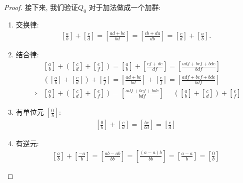 \documentclass[utf8]{ctexbook}
\begin{document}
\begin{proof}
接下来, 我们验证$Q_0$ 对于加法做成一个加群:
\begin{enumerate}
\item{交换律:
\begin{align*}
\left[ \frac{a}{b} \right]  + \left[ \frac{c}{d} \right] = \left[ \frac{a d  + b c }{b d} \right] = \left[ \frac{c b  + d a }{d b} \right] = \left[ \frac{c}{d} \right] + \left[ \frac{a}{b} \right]   .
\end{align*}
}
\item{结合律:
\begin{align*}
& \left[ \frac{a}{b} \right] + \left(\left[ \frac{c}{d} \right] + \left[ \frac{e}{f} \right]  \right) = \left[ \frac{a}{b} \right] + \left[ \frac{cf + de  }{df} \right]  =  \left[ \frac{adf + bcf + bde  }{bdf} \right] \\
& \left( \left[ \frac{a}{b} \right] + \left[ \frac{c}{d} \right] \right) + \left[ \frac{e}{f} \right] =  \left[ \frac{a d  + b c }{b d} \right] + \left[ \frac{e}{f} \right] = \left[ \frac{a d f + b c f+ bde}{b d f} \right] \\
\Longrightarrow & \left[ \frac{a}{b} \right] + \left(\left[ \frac{c}{d} \right] + \left[ \frac{e}{f} \right]  \right) = \left[ \frac{adf + bcf + bde  }{bdf} \right] = \left( \left[ \frac{a}{b} \right] + \left[ \frac{c}{d} \right] \right) + \left[ \frac{e}{f} \right] 
\end{align*}
}
\item{有单位元 $ \left[ \frac{0}{b} \right] $:
\begin{align*}
\left[ \frac{0}{b} \right] + \left[ \frac{c}{d} \right] = \left[ \frac{b c}{b d} \right] = \left[ \frac{c}{d} \right] 
\end{align*}

}
\item{有逆元:
\begin{align*}
\left[ \frac{a}{b} \right] + \left[ \frac{-a}{b} \right] = \left[ \frac{a b - a b}{b b} \right] = \left[ \frac{(a  - a) b}{b b} \right] = \left[ \frac{a  - a }{ b} \right] = \left[ \frac{0}{b} \right] 
\end{align*}
}
\end{enumerate}


\end{proof}
\end{document}
